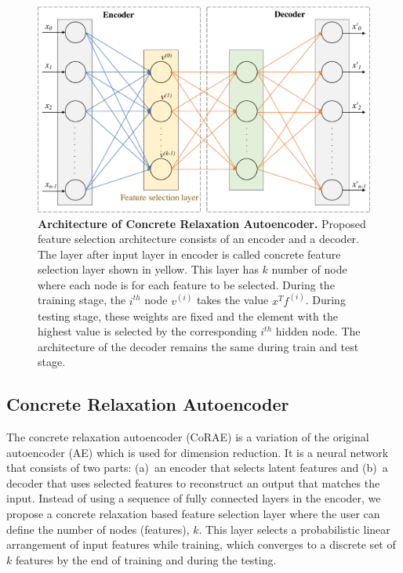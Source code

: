 \documentclass{bioinfo}
\begin{document}
\begin{figure}[h!]
    \centering
    \includegraphics[scale=0.5]{fig/architecture.pdf}
    \caption{\textbf{Architecture of Concrete Relaxation Autoencoder.} Proposed feature selection architecture consists of an encoder and a decoder. The layer after input layer in encoder is called concrete feature selection layer shown in yellow. This layer has $k$ number of node where each node is for each feature to be selected. During the training stage, the $i^{th}$ node $v^{(i)}$ takes the value $x^Tf^{(i)}$.
During testing stage, these weights are fixed and the element with the highest value is selected by the corresponding $i^{th}$ hidden node.
The architecture of the decoder remains the same during train and test stage.}
    \label{fig:architecture}
\end{figure}
\subsection{Concrete Relaxation Autoencoder} \label{CoRAE}
The concrete relaxation autoencoder (CoRAE) is a variation of the original autoencoder (AE) \citep{hinton2006reducing} which is used for dimension reduction. 
It is a neural network that consists of two parts: (a)~an encoder that selects latent features and (b)~a decoder that uses selected features to reconstruct an output that matches the input. 
Instead of using a sequence of fully connected layers in the encoder,  we propose a concrete relaxation based feature selection layer where the user can define the number of nodes (features), $k$. 
This layer selects a probabilistic linear arrangement of input features while training, which converges to a discrete set of $k$ features by the end of training and during the testing. 
\end{document}
